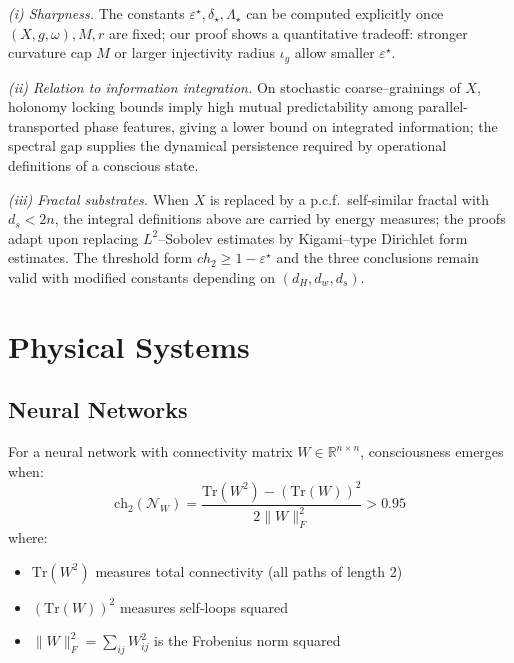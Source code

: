 \noindent
\emph{(i) Sharpness.}
The constants $\varepsilon^\star,\delta_\star,\Lambda_\star$ can be computed explicitly once $(X,g,\omega),M,r$ are fixed; our proof shows a quantitative tradeoff:
stronger curvature cap $M$ or larger injectivity radius $\iota_g$ allow smaller $\varepsilon^\star$.

\smallskip
\noindent
\emph{(ii) Relation to information integration.}
On stochastic coarse--grainings of $X$, holonomy locking bounds imply high mutual predictability among parallel-transported phase features, giving a lower bound on integrated information; the spectral gap supplies the dynamical persistence required by operational definitions of a conscious state.

\smallskip
\noindent
\emph{(iii) Fractal substrates.}
When $X$ is replaced by a p.c.f.\ self-similar fractal with $d_s<2n$,
the integral definitions above are carried by energy measures; the proofs adapt upon replacing $L^2$--Sobolev estimates by Kigami--type Dirichlet form estimates. The threshold form $ch_2\ge 1-\varepsilon^\star$ and the three conclusions remain valid with modified constants depending on $(d_H,d_w,d_s)$.

\section{Physical Systems}
\label{sec:physical-systems}

\subsection{Neural Networks}

\begin{thm}\label{thm:neural-consciousness}
For a neural network with connectivity matrix $W \in \mathbb{R}^{n \times n}$, consciousness emerges when:
\begin{equation}
\boxed{\text{ch}_2(\mathcal{N}_W) = \frac{\text{Tr}(W^2) - (\text{Tr}(W))^2}{2\|W\|_F^2} > 0.95}
\end{equation}
where:
\begin{itemize}
\item $\text{Tr}(W^2)$ measures total connectivity (all paths of length 2)
\item $(\text{Tr}(W))^2$ measures self-loops squared
\item $\|W\|_F^2 = \sum_{ij} W_{ij}^2$ is the Frobenius norm squared
\end{itemize}
\end{thm}

